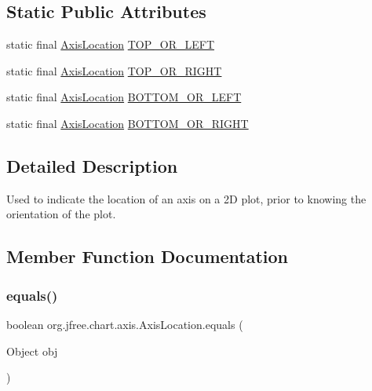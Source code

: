 \subsection*{Static Public Attributes}
\begin{DoxyCompactItemize}
\item 
static final \mbox{\hyperlink{classorg_1_1jfree_1_1chart_1_1axis_1_1_axis_location}{Axis\+Location}} \mbox{\hyperlink{classorg_1_1jfree_1_1chart_1_1axis_1_1_axis_location_a0c42bd8f74d6fb751b809984a6f91f89}{T\+O\+P\+\_\+\+O\+R\+\_\+\+L\+E\+FT}}
\item 
static final \mbox{\hyperlink{classorg_1_1jfree_1_1chart_1_1axis_1_1_axis_location}{Axis\+Location}} \mbox{\hyperlink{classorg_1_1jfree_1_1chart_1_1axis_1_1_axis_location_a6285f4058085499e5f0bda2279624e2a}{T\+O\+P\+\_\+\+O\+R\+\_\+\+R\+I\+G\+HT}}
\item 
static final \mbox{\hyperlink{classorg_1_1jfree_1_1chart_1_1axis_1_1_axis_location}{Axis\+Location}} \mbox{\hyperlink{classorg_1_1jfree_1_1chart_1_1axis_1_1_axis_location_a3c4f375e45e6d6c8bec30e36c47a4f2e}{B\+O\+T\+T\+O\+M\+\_\+\+O\+R\+\_\+\+L\+E\+FT}}
\item 
static final \mbox{\hyperlink{classorg_1_1jfree_1_1chart_1_1axis_1_1_axis_location}{Axis\+Location}} \mbox{\hyperlink{classorg_1_1jfree_1_1chart_1_1axis_1_1_axis_location_a31c118d2a9b57e824fc11e03a8b5ab44}{B\+O\+T\+T\+O\+M\+\_\+\+O\+R\+\_\+\+R\+I\+G\+HT}}
\end{DoxyCompactItemize}


\subsection{Detailed Description}
Used to indicate the location of an axis on a 2D plot, prior to knowing the orientation of the plot. 

\subsection{Member Function Documentation}
\mbox{\label{classorg_1_1jfree_1_1chart_1_1axis_1_1_axis_location_ae6e2510d7a2eac2c26a9ecfe4e9aeaa3}} 
\subsubsection{\texorpdfstring{equals()}{equals()}}
{\footnotesize\ttfamily boolean org.\+jfree.\+chart.\+axis.\+Axis\+Location.\+equals (\begin{DoxyParamCaption}\item[{Object}]{obj }\end{DoxyParamCaption})}

